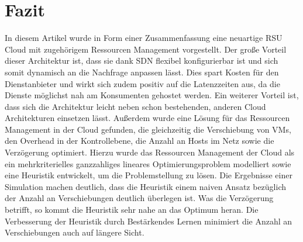 \documentclass[conference]{IEEEtran}
\begin{document}
\section{Fazit}

In diesem Artikel wurde in Form einer Zusammenfassung eine neuartige RSU Cloud mit zugehörigem Ressourcen Management vorgestellt. Der große Vorteil dieser Architektur ist, dass sie dank SDN flexibel konfigurierbar ist und sich somit dynamisch an die Nachfrage anpassen lässt. Dies spart Kosten für den Dienstanbieter und wirkt sich zudem positiv auf die Latenzzeiten aus, da die Dienste möglichst nah am Konsumenten gehostet werden. Ein weiterer Vorteil ist, dass sich die Architektur leicht neben schon bestehenden, anderen Cloud Architekturen einsetzen lässt.
Außerdem wurde eine Lösung für das Ressourcen Management in der Cloud gefunden, die gleichzeitig die Verschiebung von VMs, den Overhead in der Kontrollebene, die Anzahl an Hosts im Netz sowie die Verzögerung optimiert.
Hierzu wurde das Ressourcen Management der Cloud als ein mehrkriterielles ganzzahliges lineares Optimierungsproblem modelliert sowie eine Heuristik entwickelt, um die Problemstellung zu lösen.
Die Ergebnisse einer Simulation machen deutlich, dass die Heuristik einem naiven Ansatz bezüglich der Anzahl an Verschiebungen deutlich überlegen ist. Was die Verzögerung betrifft, so kommt die Heuristik sehr nahe an das Optimum heran.
Die Verbesserung der Heuristik durch Bestärkendes Lernen minimiert die Anzahl an Verschiebungen auch auf längere Sicht. 
\end{document}
